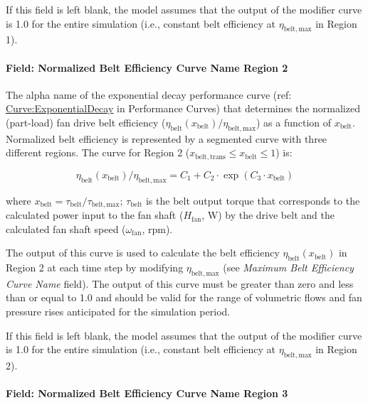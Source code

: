 If this field is left blank, the model assumes that the output of the modifier curve is 1.0 for the entire simulation (i.e., constant belt efficiency at \(\eta_{\mathrm{belt, max}}\) in Region 1).

\paragraph{Field: Normalized Belt Efficiency Curve Name Region 2}\label{field-normalized-belt-efficiency-curve-name-region-2}

The alpha name of the exponential decay performance curve (ref: \hyperref[curveexponentialdecay]{Curve:ExponentialDecay} in Performance Curves) that determines the normalized (part-load) fan drive belt efficiency (\(\eta_{\mathrm{belt}} (x_{\mathrm{belt}}) / \eta_{\mathrm{belt, max}}\)) as a function of \(x_{\mathrm{belt}}\). Normalized belt efficiency is represented by a segmented curve with three different regions. The curve for Region 2 (\(x_{\mathrm{belt, trans}} \le x_{\mathrm{belt}} \le 1\)) is:

\begin{equation}
  \eta_{\mathrm{belt}} (x_{\mathrm{belt}}) / \eta_{\mathrm{belt, max}} = C_1 + C_2 \cdot \exp(C_3 \cdot x_{\mathrm{belt}})
\end{equation}

where \(x_{\mathrm{belt}} = \tau_{\mathrm{belt}} / \tau_{\mathrm{belt, max}}\); \(\tau_{\mathrm{belt}}\) is the belt output torque that corresponds to the calculated power input to the fan shaft (\(H_{\mathrm{fan}}\), W) by the drive belt and the calculated fan shaft speed (\(\omega_{\mathrm{fan}}\), rpm).

The output of this curve is used to calculate the belt efficiency \(\eta_{\mathrm{belt}} (x_{\mathrm{belt}})\) in Region 2 at each time step by modifying \(\eta_{\mathrm{belt, max}}\) (see \emph{Maximum Belt Efficiency Curve Name} field). The output of this curve must be greater than zero and less than or equal to 1.0 and should be valid for the range of volumetric flows and fan pressure rises anticipated for the simulation period.

If this field is left blank, the model assumes that the output of the modifier curve is 1.0 for the entire simulation (i.e., constant belt efficiency at \(\eta_{\mathrm{belt, max}}\) in Region 2).

\paragraph{Field: Normalized Belt Efficiency Curve Name Region 3}\label{field-normalized-belt-efficiency-curve-name-region-3}

